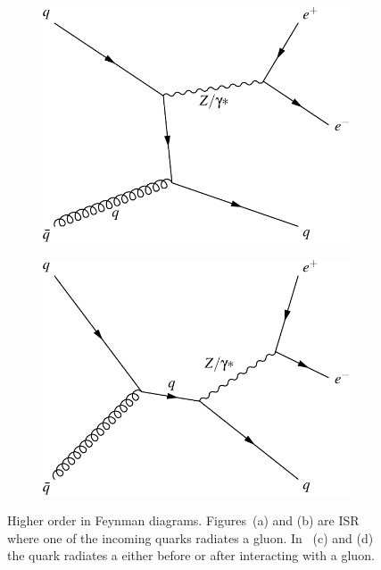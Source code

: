\begin{figure}[!p]
\begin{subfigure}[b]{\SideBySidePlotWidth}
        \includegraphics[width=\linewidth]{figures/feyn_qg_to_zq.pdf}
        \caption{}
        \label{fig:feyn_qg_to_zq}
    \end{subfigure}%
    \begin{subfigure}[b]{\SideBySidePlotWidth}
        \includegraphics[width=\linewidth]{figures/feyn_qg_to_q_to_zq.pdf}
        \caption{}
        \label{fig:feyn_qg_to_q_to_zq}
    \end{subfigure}
    \caption[
        Higher order in \alphastrong \Ztoee Feynman diagrams.
    ]{
        Higher order in \alphastrong \Ztoee Feynman diagrams. Figures~(a) and
        (b) are ISR where one of the incoming quarks radiates a gluon. In
        \FIGS~(c) and (d) the quark radiates a \Z either before or after
        interacting with a gluon.
    }
    \label{fig:higher_order_z_diagrams}
\end{figure}

